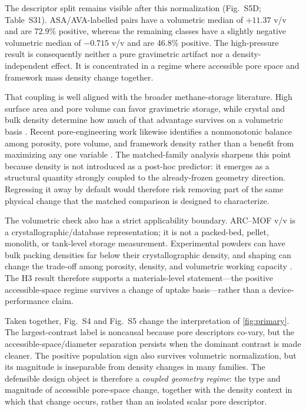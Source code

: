 \documentclass[11pt,a4paper]{article}
\newcommand{\SIfig}[1]{Fig.~S#1}
\newcommand{\SItab}[1]{Table~S#1}
\begin{document}
The descriptor split remains visible after this normalization
(\SIfig{5}D; \SItab{31}). ASA/AVA-labelled pairs have a volumetric median of
$+11.37$ v/v and are 72.9\% positive, whereas the remaining classes have a
slightly negative volumetric median of $-0.715$ v/v and are 46.8\% positive. The
high-pressure result is consequently neither a pure gravimetric artifact nor a
density-independent effect. It is concentrated in a regime where accessible pore
space and framework mass density change together.

That coupling is well aligned with the broader methane-storage literature. High
surface area and pore volume can favor gravimetric storage, while crystal and bulk
density determine how much of that advantage survives on a volumetric basis
\cite{peng2013methane,gandara2014al,korman2020lowpressure,
connolly2019monolith}. Recent pore-engineering work likewise identifies a
nonmonotonic balance among porosity, pore volume, and framework density rather than
a benefit from maximizing any one variable \cite{song2026poreengineering}. The
matched-family analysis sharpens this point because density is not introduced as a
post-hoc predictor: it emerges as a structural quantity strongly coupled to the
already-frozen geometry direction. Regressing it away by default would therefore
risk removing part of the same physical change that the matched comparison is
designed to characterize.

The volumetric check also has a strict applicability boundary. ARC--MOF v/v is a
crystallographic/database representation; it is not a packed-bed, pellet, monolith,
or tank-level storage measurement. Experimental powders can have bulk packing
densities far below their crystallographic density, and shaping can change the
trade-off among porosity, density, and volumetric working capacity
\cite{korman2020lowpressure,connolly2019monolith}. The H3 result therefore supports
a materials-level statement---the positive accessible-space regime survives a
change of uptake basis---rather than a device-performance claim.

Taken together, \SIfig{4} and \SIfig{5} change the interpretation of
\cref{fig:primary}. The largest-contrast label is noncausal because pore
descriptors co-vary, but the accessible-space/diameter separation persists when
the dominant contrast is made cleaner. The positive population sign also survives
volumetric normalization, but its magnitude is inseparable from density changes in
many families. The defensible design object is therefore a \emph{coupled geometry
regime}: the type and magnitude of accessible pore-space change, together with the
density context in which that change occurs, rather than an isolated scalar pore
descriptor.
\end{document}
